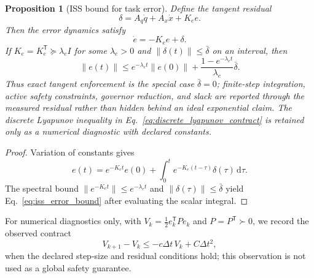 \documentclass[preprint,12pt]{elsarticle}
\newcommand{\T}{^{\mathsf T}}
\newtheorem{proposition}{Proposition}
\begin{document}
\begin{proposition}[ISS bound for task error]
\label{prop:error_decay}
Define the tangent residual
\begin{equation}
\delta=A_q\dot q+A_x\dot x+K_e e.
\label{eq:tangent_residual}
\end{equation}
Then the error dynamics satisfy
\begin{equation}
\dot e=-K_e e+\delta.
\end{equation}
If $K_e=K_e\T\succeq\lambda_e I$ for some $\lambda_e>0$ and $\|\delta(t)\|\leq\bar\delta$ on an interval, then
\begin{equation}
\|e(t)\|
\leq e^{-\lambda_e t}\|e(0)\|
+\frac{1-e^{-\lambda_e t}}{\lambda_e}\bar\delta.
\label{eq:iss_error_bound}
\end{equation}
Thus exact tangent enforcement is the special case $\bar\delta=0$; finite-step integration, active safety constraints, governor reduction, and slack are reported through the measured residual rather than hidden behind an ideal exponential claim. The discrete Lyapunov inequality in Eq.~\eqref{eq:discrete_lyapunov_contract} is retained only as a numerical diagnostic with declared constants.
\end{proposition}
\begin{proof}
Variation of constants gives
\[
e(t)=e^{-K_e t}e(0)+\int_0^t e^{-K_e(t-\tau)}\delta(\tau)\,\mathrm d\tau.
\]
The spectral bound $\|e^{-K_e t}\|\leq e^{-\lambda_e t}$ and $\|\delta(\tau)\|\leq\bar\delta$ yield Eq.~\eqref{eq:iss_error_bound} after evaluating the scalar integral.
\end{proof}
For numerical diagnostics only, with $V_k=\tfrac12 e_k\T P e_k$ and $P=P\T\succ0$, we record the observed contract
\begin{equation}
V_{k+1}-V_k\leq-c\Delta t\,V_k+C\Delta t^2,
\label{eq:discrete_lyapunov_contract}
\end{equation}
when the declared step-size and residual conditions hold; this observation is not used as a global safety guarantee.
\end{document}
